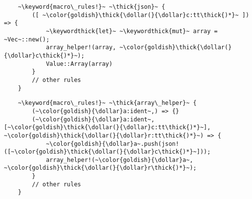 \documentclass[usepdftitle=false]{beamer}
\newcommand{\dollar}{\makebox[\widthof{\$}][c]{\$}}
\newcommand{\thick}[1]{\contourlength{0.16pt}\contour[10]{black}{#1}}
\newcommand{\keyword}[1]{\color{greenish}#1}
\newcommand{\keywordthick}[1]{\color{greenish}\contourlength{0.20pt}\contour[10]{greenish}{#1}}
\begin{document}
\begin{frame}[fragile]
  \vspace*{-8pt}
  \begin{verbatim}
    ~\keyword{macro\_rules!}~ ~\thick{json}~ {
        ([ ~\color{goldish}\thick{\dollar(}{\dollar}c:tt\thick{)*}~ ]) => {
            ~\keywordthick{let}~ ~\keywordthick{mut}~ array = ~Vec~::new();
            array_helper!(array, ~\color{goldish}\thick{\dollar(}{\dollar}c\thick{)*}~);
            Value::Array(array)
        }
        // other rules
    }
  \end{verbatim}
  \vspace*{-13pt}
  \begin{verbatim}
    ~\keyword{macro\_rules!}~ ~\thick{array\_helper}~ {
        (~\color{goldish}{\dollar}a:ident~,) => {}
        (~\color{goldish}{\dollar}a:ident~, [~\color{goldish}\thick{\dollar(}{\dollar}c:tt\thick{)*}~], ~\color{goldish}\thick{\dollar(}{\dollar}r:tt\thick{)*}~) => {
            ~\color{goldish}{\dollar}a~.push(json!([~\color{goldish}\thick{\dollar(}{\dollar}c\thick{)*}~]));
            array_helper!(~\color{goldish}{\dollar}a~, ~\color{goldish}\thick{\dollar(}{\dollar}r\thick{)*}~);
        }
        // other rules
    }
  \end{verbatim}
\end{frame}
\end{document}
